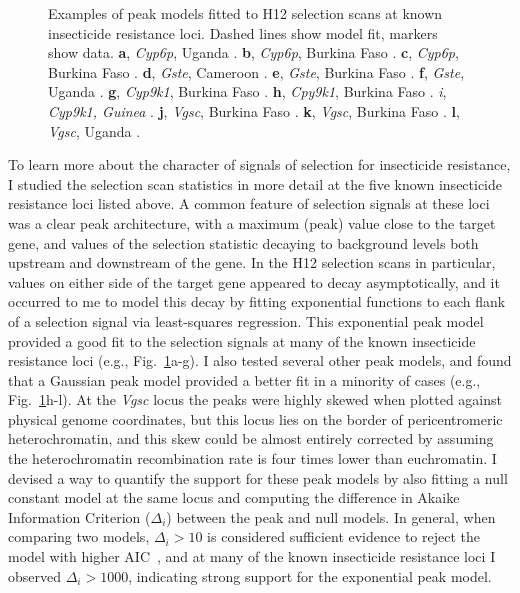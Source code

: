 \begin{refsection}
\begin{figure}[tp]
\begin{subfigure}[t]{0.32\textwidth}
    \end{subfigure}
    \caption{Examples of peak models fitted to H12 selection scans at known insecticide resistance loci. Dashed lines show model fit, markers show data. \textbf{a}, \textit{Cyp6p}, Uganda \agam. \textbf{b}, \textit{Cyp6p}, Burkina Faso \agam. \textbf{c}, \textit{Cyp6p}, Burkina Faso \acol. \textbf{d}, \textit{Gste}, Cameroon \agam. \textbf{e}, \textit{Gste}, Burkina Faso \agam. \textbf{f}, \textit{Gste}, Uganda \agam. \textbf{g}, \textit{Cyp9k1}, Burkina Faso \agam. \textbf{h}, \textit{Cpy9k1}, Burkina Faso \acol. \textit{i}, \textit{Cyp9k1, Guinea \agam}. \textbf{j}, \textit{Vgsc}, Burkina Faso \acol. \textbf{k}, \textit{Vgsc}, Burkina Faso \agam. \textbf{l}, \textit{Vgsc}, Uganda \agam.}
    \label{fig:peak_fits}
\end{figure}


To learn more about the character of signals of selection for insecticide resistance, I studied the selection scan statistics in more detail at the five known insecticide resistance loci listed above.
%
A common feature of selection signals at these loci was a clear peak architecture, with a maximum (peak) value close to the target gene, and values of the selection statistic decaying to background levels both upstream and downstream of the gene.
%
In the H12 selection scans in particular, values on either side of the target gene appeared to decay asymptotically, and it occurred to me to model this decay by fitting exponential functions to each flank of a selection signal via least-squares regression.
%
This exponential peak model provided a good fit to the selection signals at many of the known insecticide resistance loci (e.g., Fig.~\ref{fig:peak_fits}a-g).
%
I also tested several other peak models, and found that a Gaussian peak model provided a better fit in a minority of cases (e.g., Fig.~\ref{fig:peak_fits}h-l).
%
At the \textit{Vgsc} locus the peaks were highly skewed when plotted against physical genome coordinates, but this locus lies on the border of pericentromeric heterochromatin, and this skew could be almost entirely corrected by assuming the heterochromatin recombination rate is four times lower than euchromatin.
%
I devised a way to quantify the support for these peak models by also fitting a null constant model at the same locus and computing the difference in Akaike Information Criterion ($\Delta_i$) between the peak and null models.
%
In general, when comparing two models, $\Delta_i > 10$ is considered sufficient evidence to reject the model with higher AIC~\parencite{Burnham2002}, and at many of the known insecticide resistance loci I observed $\Delta_i > 1000$, indicating strong support for the exponential peak model.
%



\end{refsection}
